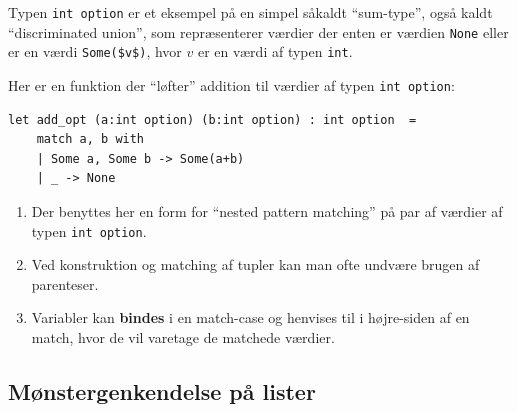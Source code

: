 \documentclass[rgb]{beamer}
\begin{document}
\begin{frame}[fragile]
\begin{footnotesize}


  \vspace{1ex}

  Typen \lstinline{int option} er et eksempel på en simpel såkaldt
  ``sum-type'', også kaldt ``discriminated union'', som repræsenterer
  værdier der enten er værdien \lstinline{None} eller er en værdi
  \lstinline[mathescape]{Some($v$)}, hvor $v$ er en værdi af typen
  \lstinline{int}.

    \vspace{1ex}

  Her er en funktion der ``løfter'' addition til værdier af typen \lstinline{int option}:
\begin{lstlisting}[numbers=none,frame=none,mathescape]
  let add_opt (a:int option) (b:int option) : int option  =
    match a, b with
    | Some a, Some b -> Some(a+b)
    | _ -> None
\end{lstlisting}

  \begin{enumerate}
  \item Der benyttes her en form for ``nested pattern matching'' på
    par af værdier af typen \lstinline{int option}.
  \item Ved konstruktion og matching af tupler kan man ofte undvære brugen af parenteser.
  \item Variabler kan \textbf{bindes} i en match-case og henvises til i højre-siden af en match, hvor de vil varetage de matchede værdier.
  \end{enumerate}
\end{footnotesize}
\end{frame}

\subsection{Mønstergenkendelse på lister}
\end{document}

